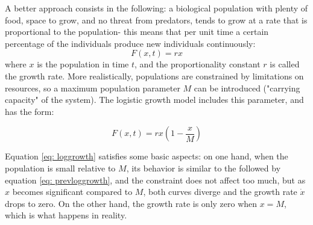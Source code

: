 A better approach consists in the following: a biological population with plenty of food, space to grow, and no threat from predators, tends to grow at a rate that is proportional to the population- this means that per unit time a certain percentage of the individuals produce new individuals continuously:
\begin{equation}\label{eq: prevloggrowth}
F(x,t)=rx
\end{equation}
where $x$ is the population in time $t$, and the proportionality constant $r$ is called the growth rate. More realistically, populations are constrained by limitations on resources, so a maximum population parameter $M$ can be introduced ("carrying capacity" of the system). The logistic growth model includes this parameter, and has the form:

\begin{equation}\label{eq: loggrowth}
F(x,t)=rx\left(1-\frac{x}{M}\right)
\end{equation}

Equation \ref{eq: loggrowth} satisfies some basic aspects: on one hand, when the population is small relative to $M$, its behavior is similar to the followed by equation \ref{eq: prevloggrowth}, and the constraint does not affect too much, but as $x$ becomes significant compared to $M$, both curves diverge and the growth rate $\dot{x}$ drops to zero. On the other hand, the growth rate is only zero when $x=M$, which is what happens in reality.